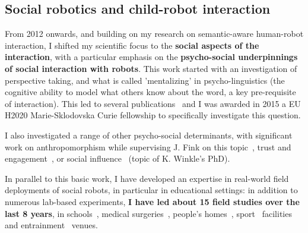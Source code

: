 




\subsection{Social robotics and child-robot interaction}

From 2012 onwards, and building on my research on semantic-aware human-robot
interaction, I shifted my scientific focus to the \textbf{social aspects of the
interaction}, with a particular emphasis on the \textbf{psycho-social
underpinnings of social interaction with robots}. This work started with an
investigation of perspective taking, and what is called 'mentalizing' in
psycho-linguistics (the cognitive ability to model what others know about the
word, a key pre-requisite of interaction). This led to several
publications~\autocite{ros2010which, warnier2012when, lemaignan2015mutual,
dillenbourg2016symmetry} and I was awarded in 2015 a EU H2020 Marie-Sklodovska
Curie fellowship to specifically investigate this question.

I also investigated a range of other psycho-social determinants, with
significant work on anthropomorphism while supervising J. Fink on this
topic~\autocite{lemaignan2014cognitive,fink2014which,
fink2014dynamics,lemaignan2015youre}, trust and
engagement~\autocite{flook2019impact,lemaignan2015youre,fink2014which,wijnen2020performing},
or social influence~\autocite{irfan2018social, winkle2019effective} (topic of K.
Winkle's PhD).


In parallel to this basic work, I have developed an expertise in real-world field
deployments of social robots, in particular in educational settings: in addition
to numerous lab-based experiments, \textbf{I have led about 15 field studies
over the last 8 years}, in schools~\autocite{hood2015when, jacq2016building,
baxter2015wider, kennedy2016cautious, chandra2015children, senft2018robots, wallbridge2018using},
medical surgeries~\autocite{lemaignan2016learning}, people's
homes~\autocite{mondada2015ranger},
sport~\autocite{winkle2020couch,winkle2020insitu} facilities and
entrainment~\autocite{lemaignan2012roboscopie} venues.

